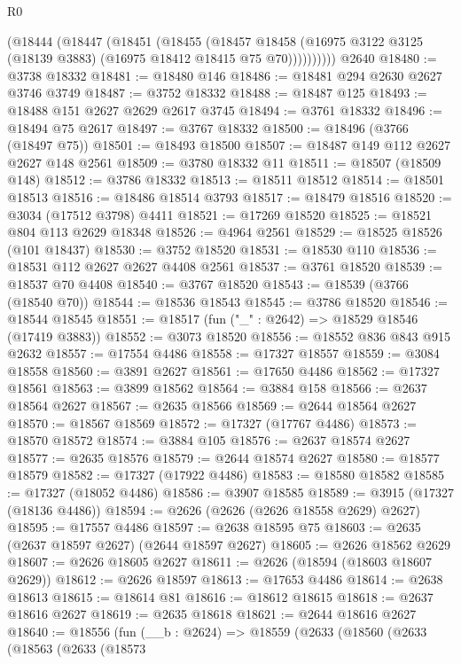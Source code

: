 \begin{lexlean}{R0}
\begin{coremodule}
          (@18444
            (@18447
              (@18451
                (@18455
                  (@18457
                    @18458
                    (@16975 @3122 @3125 (@18139 @3883) (@16975 @18412 @18415 @75 @70))))))))))
    @2640
@18480 := @3738 @18332
@18481 := @18480 @146
@18486 := @18481 @294 @2630 @2627 @3746 @3749
@18487 := @3752 @18332
@18488 := @18487 @125
@18493 := @18488 @151 @2627 @2629 @2617 @3745
@18494 := @3761 @18332
@18496 := @18494 @75 @2617
@18497 := @3767 @18332
@18500 := @18496 (@3766 (@18497 @75))
@18501 := @18493 @18500
@18507 := @18487 @149 @112 @2627 @2627 @148 @2561
@18509 := @3780 @18332 @11
@18511 := @18507 (@18509 @148)
@18512 := @3786 @18332
@18513 := @18511 @18512
@18514 := @18501 @18513
@18516 := @18486 @18514 @3793
@18517 := @18479 @18516
@18520 := @3034 (@17512 @3798) @4411
@18521 := @17269 @18520
@18525 := @18521 @804 @113 @2629 @18348
@18526 := @4964 @2561
@18529 := @18525 @18526 (@101 @18437)
@18530 := @3752 @18520
@18531 := @18530 @110
@18536 := @18531 @112 @2627 @2627 @4408 @2561
@18537 := @3761 @18520
@18539 := @18537 @70 @4408
@18540 := @3767 @18520
@18543 := @18539 (@3766 (@18540 @70))
@18544 := @18536 @18543
@18545 := @3786 @18520
@18546 := @18544 @18545
@18551 := @18517 (fun ("_" : @2642) => @18529 @18546 (@17419 @3883))
@18552 := @3073 @18520
@18556 := @18552 @836 @843 @915 @2632
@18557 := @17554 @4486
@18558 := @17327 @18557
@18559 := @3084 @18558
@18560 := @3891 @2627
@18561 := @17650 @4486
@18562 := @17327 @18561
@18563 := @3899 @18562
@18564 := @3884 @158
@18566 := @2637 @18564 @2627
@18567 := @2635 @18566
@18569 := @2644 @18564 @2627
@18570 := @18567 @18569
@18572 := @17327 (@17767 @4486)
@18573 := @18570 @18572
@18574 := @3884 @105
@18576 := @2637 @18574 @2627
@18577 := @2635 @18576
@18579 := @2644 @18574 @2627
@18580 := @18577 @18579
@18582 := @17327 (@17922 @4486)
@18583 := @18580 @18582
@18585 := @17327 (@18052 @4486)
@18586 := @3907 @18585
@18589 := @3915 (@17327 (@18136 @4486))
@18594 := @2626 (@2626 (@2626 @18558 @2629) @2627)
@18595 := @17557 @4486
@18597 := @2638 @18595 @75
@18603 := @2635 (@2637 @18597 @2627) (@2644 @18597 @2627)
@18605 := @2626 @18562 @2629
@18607 := @2626 @18605 @2627
@18611 := @2626 (@18594 (@18603 @18607 @2629))
@18612 := @2626 @18597
@18613 := @17653 @4486
@18614 := @2638 @18613
@18615 := @18614 @81
@18616 := @18612 @18615
@18618 := @2637 @18616 @2627
@18619 := @2635 @18618
@18621 := @2644 @18616 @2627
@18640 := @18556
    (fun (__b : @2624) =>
    @18559
      (@2633
        (@18560
          (@2633
            (@18563
              (@2633
                (@18573

\end{coremodule}
\end{lexlean}
